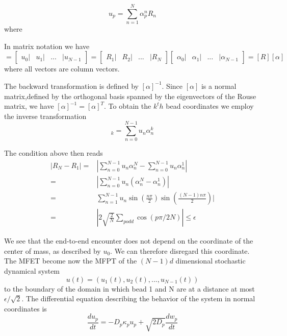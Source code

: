 \documentclass[12pt]{report}
\begin{document}
\begin{equation*}
u_p = \sum_{n=1}^{N}\alpha_p^nR_n
\end{equation*}
where 

In matrix notation we have 
\begin{equation*}
[U]=\left[ \begin{matrix}
u_0|& u_1| &... & |u_{N-1}
\end{matrix}\right] = 
\left[\begin{matrix}
R_1 |&R_2|&...& |R_N 
\end{matrix}\right]
\left[\begin{matrix}
\alpha_0|&\alpha_1|&...&|\alpha_{N-1} 
\end{matrix}\right] = [R][\alpha]
\end{equation*}
where all vectors are column vectors. 

The backward transformation is defined by $[\alpha]^{-1}$. Since $[\alpha]$ is a normal matrix,defined by the orthogonal basis spanned by the eigenvectors of the Rouse matrix, we have $[\alpha]^{-1}=[\alpha]^T$. 
To obtain the $k^th$ bead coordinates we employ the inverse transformation
\begin{equation*}
[R]_k=\sum_{n=0}^{N-1}u_n\alpha_n^k
\end{equation*}

The condition above then reads 
\begin{eqnarray*}
|R_N-R_1|=& |\sum_{n=0}^{N-1}u_n\alpha_n^N -\sum_{n=0}^{N-1}u_n\alpha_n^1|\\
         =& |\sum_{n=0}^{N-1}u_n(\alpha_n^N -\alpha_n^1)|\\  
         =& \sum_{n=1}^{N-1}u_n\sin\left(\frac{n\pi}{2}\right)\sin\left(\frac{(N-1)n\pi}{2}\right)|\\
         =& |2\sqrt{\frac{2}{N}}\sum_{p odd}\cos(p\pi/2N)| \leq \epsilon
\end{eqnarray*}

We see that the end-to-end encounter does not depend on the coordinate of the center of mass, as described by $u_0$. We can therefore disregard this coordinate. The MFET become now the MFPT of the $(N-1)d$ dimensional stochastic dynamical system
\begin{equation*}
u(t) = \left(u_1(t),u_2(t),...,u_{N-1}(t) \right)
\end{equation*}
to the boundary of the domain in which bead 1 and N are at a distance at most $\epsilon/\sqrt{2}$.
The differential equation describing the behavior of the system in normal coordinates is 
\begin{equation*}
\frac{du_p}{dt}=-D_p\kappa_pu_p+\sqrt{2D_p}\frac{dw_p}{dt}
\end{equation*}
\end{document}
